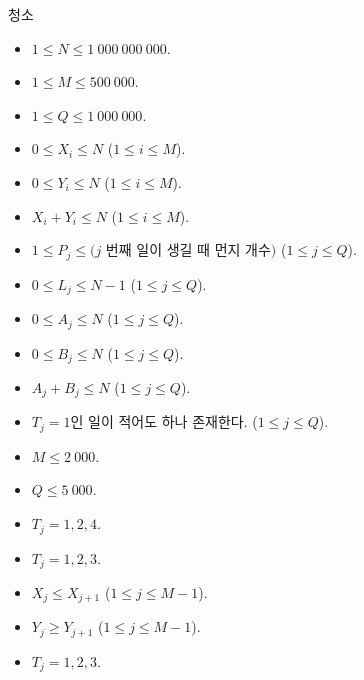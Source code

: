 \begin{problem}{청소}
	

	\Constraints


	\begin{itemize}
		
		\item $1 \le N \le 1\ 000\ 000\ 000$.
		\item $1 \le M \le 500\ 000$.
		\item $1 \le Q \le 1\ 000\ 000$.
		\item $0 \le X_i \le N$ ($1 \le i \le M$).
		\item $0 \le Y_i \le N$ ($1 \le i \le M$).
		\item $X_i + Y_i \le N$ ($1 \le i \le M$).
		\item $1 \le P_j \le (j$ 번째 일이 생길 때 먼지 개수$)$ ($1 \le j \le Q$).
		\item $0 \le L_j \le N-1$ ($1 \le j \le Q$).
		\item $0 \le A_j \le N$ ($1 \le j \le Q$).
		\item $0 \le B_j \le N$ ($1 \le j \le Q$).
		\item $A_j + B_j \le N$ ($1 \le j \le Q$).
		\item $T_j = 1$인 일이 적어도 하나 존재한다. ($1 \le j \le Q$).
	\end{itemize}


	\begin{itemize}
		\item $M \le 2\ 000$.
		\item $Q \le 5\ 000$.
	\end{itemize}

	
	\begin{itemize}
		\item $T_j = 1, 2, 4$.
	\end{itemize}


	\begin{itemize}
		\item $T_j = 1, 2, 3$.
		\item $X_j \le X_{j+1}$ ($1 \le j \le M-1$).
		\item $Y_j \ge Y_{j+1}$ ($1 \le j \le M-1$).
	\end{itemize}

	
	\begin{itemize}
		\item $T_j = 1, 2, 3$.
	\end{itemize}
	
	

\end{problem}

